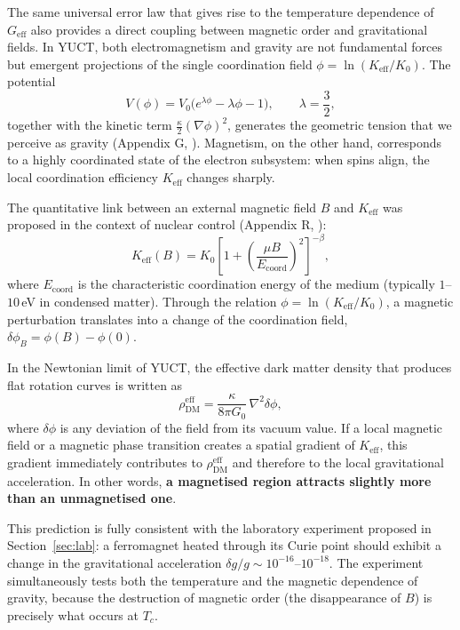 \documentclass[12pt]{article}
\theoremstyle{remark}
\newcommand{\Keff}{K_{\mathrm{eff}}}
\begin{document}
	The same universal error law that gives rise to the temperature dependence of $G_{\mathrm{eff}}$
	also provides a direct coupling between magnetic order and gravitational fields.
	In YUCT, both electromagnetism and gravity are not fundamental forces but emergent
	projections of the single coordination field $\phi = \ln(\Keff/K_0)$. 
	The potential
	\begin{equation}
		V(\phi) = V_0\bigl(e^{\lambda\phi} - \lambda\phi - 1\bigr), \qquad \lambda = \frac{3}{2},
	\end{equation}
	together with the kinetic term $\frac{\kappa}{2}(\nabla\phi)^2$, generates the geometric tension
	that we perceive as gravity (Appendix G, \cite{AppendixG}). 
	Magnetism, on the other hand, corresponds to a highly coordinated state of the electron
	subsystem: when spins align, the local coordination efficiency $\Keff$ changes sharply.
	
	The quantitative link between an external magnetic field $B$ and $\Keff$ was proposed
	in the context of nuclear control (Appendix R, \cite{AppendixR}):
	\begin{equation}
		\Keff(B) = K_0 \left[ 1 + \left( \frac{\mu B}{E_{\mathrm{coord}}} \right)^2 \right]^{-\beta},
		\label{eq:keff-B}
	\end{equation}
	where $E_{\mathrm{coord}}$ is the characteristic coordination energy of the medium
	(typically $1$--$10$\,eV in condensed matter). 
	Through the relation $\phi = \ln(\Keff/K_0)$, a magnetic perturbation translates into
	a change of the coordination field, $\delta\phi_B = \phi(B) - \phi(0)$.
	
	In the Newtonian limit of YUCT, the effective dark matter density that produces
	flat rotation curves is written as
	\begin{equation}
		\rho_{\mathrm{DM}}^{\mathrm{eff}} = \frac{\kappa}{8\pi G_0}\,\nabla^2\delta\phi,
		\label{eq:rho-dm}
	\end{equation}
	where $\delta\phi$ is any deviation of the field from its vacuum value.
	If a local magnetic field or a magnetic phase transition creates a spatial gradient
	of $\Keff$, this gradient immediately contributes to $\rho_{\mathrm{DM}}^{\mathrm{eff}}$
	and therefore to the local gravitational acceleration. 
	In other words, \textbf{a magnetised region attracts slightly more than an unmagnetised one}.
	
	This prediction is fully consistent with the laboratory experiment proposed in
	Section~\ref{sec:lab}: a ferromagnet heated through its Curie point should exhibit
	a change in the gravitational acceleration $\delta g/g \sim 10^{-16}$--$10^{-18}$.
	The experiment simultaneously tests both the temperature and the magnetic dependence
	of gravity, because the destruction of magnetic order (the disappearance of $B$) is
	precisely what occurs at $T_c$.
	
\end{document}
